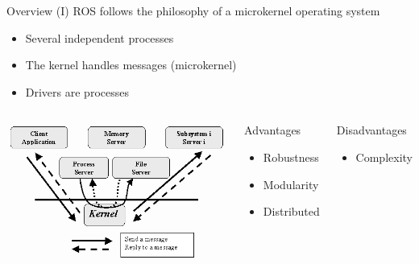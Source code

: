\documentclass[10pt,compress]{beamer} %
\begin{document}
\begin{frame}{Overview (I)}
	ROS follows the philosophy of a microkernel operating system
	\begin{itemize}
		\item Several independent processes
		\item The kernel handles messages (microkernel)
		\item Drivers are processes
  	\end{itemize}

    	\begin{columns}
	\begin{center}
	\includegraphics[width=0.8\linewidth]{figs/1kernel.png}
	\end{center}

	\begin{block}{Advantages}
	\begin{itemize}
		\item Robustness
		\item Modularity
		\item Distributed
	\end{itemize}
	\end{block}

	\begin{block}{Disadvantages}
	\begin{itemize}
		\item Complexity
	\end{itemize}
	\end{block}
	\end{columns}
\end{frame}
\end{document}
